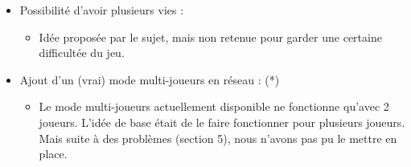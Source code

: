 \documentclass{article}
\begin{document}
\begin{itemize}
\begin{itemize}
    \end{itemize}
    \item Possibilité d'avoir plusieurs vies :
    \begin{itemize}
        \item Idée proposée par le sujet, mais non retenue pour garder une certaine difficultée du jeu.
    \end{itemize}
    \item Ajout d'un (vrai) mode multi-joueurs en réseau : (*)
    \begin{itemize}
        \item Le mode multi-joueurs actuellement disponible ne fonctionne qu'avec 2 joueurs. L'idée de base était de le faire fonctionner pour plusieurs joueurs. Mais suite à des problèmes (section 5), nous n'avons pas pu le mettre en place.
    \end{itemize}
\end{itemize}
\end{document}
